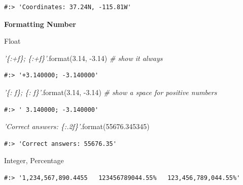 \documentclass[
]{book}
\newenvironment{Shaded}{\begin{snugshade}}{\end{snugshade}}
\newcommand{\BuiltInTok}[1]{#1}
\newcommand{\CommentTok}[1]{\textcolor[rgb]{0.37,0.37,0.37}{\textit{#1}}}
\newcommand{\FloatTok}[1]{\textcolor[rgb]{0.06,0.06,0.06}{#1}}
\newcommand{\NormalTok}[1]{#1}
\begin{document}
\begin{verbatim}
#:> 'Coordinates: 37.24N, -115.81W'
\end{verbatim}

\textbf{Formatting Number}

Float

\begin{Shaded}
\begin{Highlighting}[]
\CommentTok{'\{:+f\}; \{:+f\}'}\NormalTok{.}\BuiltInTok{format}\NormalTok{(}\FloatTok{3.14}\NormalTok{, }\FloatTok{-3.14}\NormalTok{)  }\CommentTok{# show it always}
\end{Highlighting}
\end{Shaded}

\begin{verbatim}
#:> '+3.140000; -3.140000'
\end{verbatim}

\begin{Shaded}
\begin{Highlighting}[]
\CommentTok{'\{: f\}; \{: f\}'}\NormalTok{.}\BuiltInTok{format}\NormalTok{(}\FloatTok{3.14}\NormalTok{, }\FloatTok{-3.14}\NormalTok{)  }\CommentTok{# show a space for positive numbers}
\end{Highlighting}
\end{Shaded}

\begin{verbatim}
#:> ' 3.140000; -3.140000'
\end{verbatim}

\begin{Shaded}
\begin{Highlighting}[]
\CommentTok{'Correct answers: \{:.2f\}'}\NormalTok{.}\BuiltInTok{format}\NormalTok{(}\FloatTok{55676.345345}\NormalTok{)}
\end{Highlighting}
\end{Shaded}

\begin{verbatim}
#:> 'Correct answers: 55676.35'
\end{verbatim}

Integer, Percentage

\begin{Shaded}
\end{Shaded}

\begin{verbatim}
#:> '1,234,567,890.4455   123456789044.55%   123,456,789,044.55%'
\end{verbatim}
\end{document}
